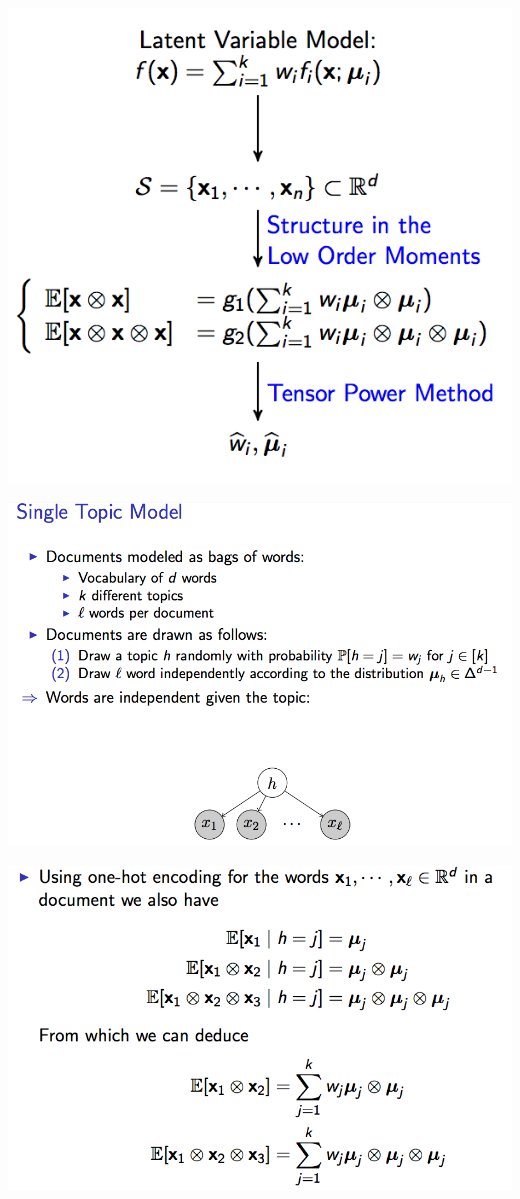 \includegraphics[width=\linewidth]{mom_2.png}

\includegraphics[width=\linewidth]{single_topic.png}

\includegraphics[width=\linewidth]{single_topic_2.png}

